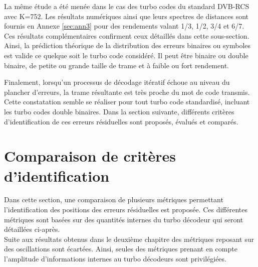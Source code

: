 La même étude a été menée dans le cas des turbo codes du standard DVB-RCS avec K=752. Les résultats numériques ainsi
que leurs spectres de distances sont fournis en Annexe \ref{sec:ann3} pour des rendements valant 1/3, 1/2, 3/4 et 6/7. 
Ces résultats complémentaires confirment ceux détaillés dans cette sous-section. Ainsi, la prédiction théorique de la distribution des erreurs binaires 
ou symboles est valide ce quelque soit le turbo code considéré. Il peut être binaire ou double binaire, de petite ou grande
taille de trame et à faible ou fort rendement.

Finalement, lorsqu'un processus de décodage itératif échoue au niveau du plancher d'erreurs, la trame résultante est très proche du 
mot de code transmis. Cette constatation semble se réaliser pour tout turbo code standardisé, incluant les turbo codes
double binaires. Dans la section suivante, différents critères d'identification de ces erreurs résiduelles sont 
proposés, évalués et comparés.
\newpage
\section{Comparaison de critères d'identification}
Dans cette section, une comparaison de plusieurs métriques permettant l'identification des positions des erreurs résiduelles est 
proposée. Ces différentes métriques sont basées sur des quantités internes du turbo décodeur qui seront détaillées ci-après.\\
Suite aux résultats obtenus dans le deuxième chapitre des métriques reposant sur des oscillations sont écartées. Ainsi, 
seules des métriques prenant en compte l'amplitude d'informations internes au turbo décodeurs sont privilégiées.

